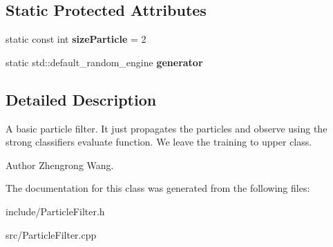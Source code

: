 \subsection*{Static Protected Attributes}
\begin{DoxyCompactItemize}
\item 
\hypertarget{classParticleFilter_affbf0bd98b03f8c047db2106c40ecfd1}{}static const int {\bfseries size\+Particle} = 2\label{classParticleFilter_affbf0bd98b03f8c047db2106c40ecfd1}

\item 
\hypertarget{classParticleFilter_a10b276ac5acdc39a1c7f5fc89dc9529d}{}static std\+::default\+\_\+random\+\_\+engine {\bfseries generator}\label{classParticleFilter_a10b276ac5acdc39a1c7f5fc89dc9529d}

\end{DoxyCompactItemize}


\subsection{Detailed Description}
A basic particle filter. It just propagates the particles and observe using the strong classifier\textquotesingle{}s evaluate function. We leave the training to upper class. \begin{DoxyAuthor}{Author}
Zhengrong Wang. 
\end{DoxyAuthor}


The documentation for this class was generated from the following files\+:\begin{DoxyCompactItemize}
\item 
include/Particle\+Filter.\+h\item 
src/Particle\+Filter.\+cpp\end{DoxyCompactItemize}
